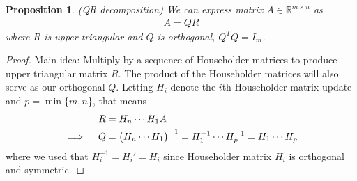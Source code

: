 \documentclass[12pt]{article}
\numberwithin{equation}{section} %
\theoremstyle{plain}
\newtheorem{prop}[thm]{Proposition}
\theoremstyle{definition}
\theoremstyle{remark}
\newcommand{\Rmn}{\mathbb{R}^{m\times n}}
\begin{document}
\begin{prop}\emph{(QR decomposition)}
We can express matrix $A\in\Rmn$ as
\begin{align*}
  A = QR
\end{align*}
where $R$ is upper triangular and $Q$ is orthogonal, $Q^TQ=I_m$.
\end{prop}
\begin{proof}
Main idea: Multiply by a sequence of Householder matrices to produce
upper triangular matrix $R$. The product of the Householder matrices
will also serve as our orthogonal $Q$.
Letting $H_i$ denote the $i$th Householder matrix update and
$p=\min\{m,n\}$, that means
\begin{align}
  R &= H_{n} \cdots H_1 A \label{qrform} \\
  \implies\quad
  Q &= \big(H_{n} \cdots H_1\big)^{-1}
  = H_{1}^{-1} \cdots H_{p}^{-1}
  = H_{1} \cdots H_{p}
  \notag
\end{align}
where we used that $H^{-1}_i=H_i'=H_i$ since Householder matrix $H_i$ is
orthogonal and symmetric.


\end{proof}
\end{document}
